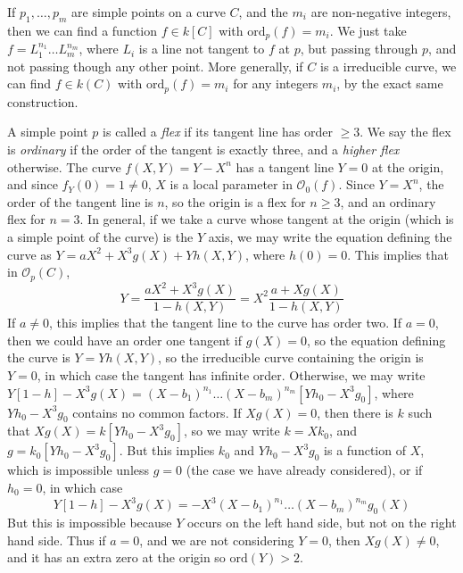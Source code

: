\begin{example}
    If $p_1, \dots, p_m$ are simple points on a curve $C$, and the $m_i$ are non-negative integers, then we can find a function $f \in k[C]$ with $\text{ord}_p(f) = m_i$. We just take $f = L_1^{n_1} \dots L_m^{n_m}$, where $L_i$ is a line not tangent to $f$ at $p$, but passing through $p$, and not passing though any other point. More generally, if $C$ is a irreducible curve, we can find $f \in k(C)$ with $\text{ord}_p(f) = m_i$ for any integers $m_i$, by the exact same construction.
\end{example}

\begin{example}
    A simple point $p$ is called a \emph{flex} if its tangent line has order $\geq 3$. We say the flex is \emph{ordinary} if the order of the tangent is exactly three, and a \emph{higher flex} otherwise. The curve $f(X,Y) = Y - X^n$ has a tangent line $Y = 0$ at the origin, and since $f_Y(0) = 1 \neq 0$, $X$ is a local parameter in $\mathcal{O}_0(f)$. Since $Y = X^n$, the order of the tangent line is $n$, so the origin is a flex for $n \geq 3$, and an ordinary flex for $n = 3$. In general, if we take a curve whose tangent at the origin (which is a simple point of the curve) is the $Y$ axis, we may write the equation defining the curve as $Y = aX^2 + X^3g(X) + Yh(X,Y)$, where $h(0) = 0$. This implies that in $\mathcal{O}_p(C)$,
    \[ Y = \frac{aX^2 + X^3g(X)}{1 - h(X,Y)} = X^2 \frac{a + Xg(X)}{1 - h(X,Y)} \]
    If $a \neq 0$, this implies that the tangent line to the curve has order two. If $a = 0$, then we could have an order one tangent if $g(X) = 0$, so the equation defining the curve is $Y = Yh(X,Y)$, so the irreducible curve containing the origin is $Y = 0$, in which case the tangent has infinite order. Otherwise, we may write $Y[1-h] - X^3g(X) = (X-b_1)^{n_1} \dots (X-b_m)^{n_m} [Yh_0 - X^3g_0]$, where $Yh_0 - X^3g_0$ contains no common factors. If $Xg(X) = 0$, then there is $k$ such that $Xg(X) = k[Yh_0 - X^3g_0]$, so we may write $k = Xk_0$, and $g = k_0[Yh_0 - X^3g_0]$. But this implies $k_0$ and $Yh_0 - X^3g_0$ is a function of $X$, which is impossible unless $g = 0$ (the case we have already considered), or if $h_0 = 0$, in which case
    \[ Y[1-h] - X^3g(X) = -X^3(X-b_1)^{n_1} \dots (X - b_m)^{n_m} g_0(X) \]
    But this is impossible because $Y$ occurs on the left hand side, but not on the right hand side. Thus if $a = 0$, and we are not considering $Y = 0$, then $Xg(X) \neq 0$, and it has an extra zero at the origin so $\text{ord}(Y) > 2$.
\end{example}

